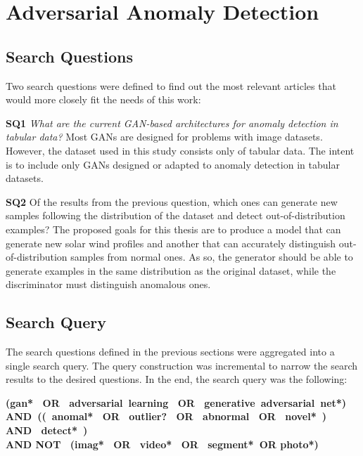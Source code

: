 \section{Adversarial Anomaly Detection}\label{sec:sota_anomaly_detection}

\subsection{Search Questions}\label{sec:gan_search_questions}
Two search questions were defined to find out the most relevant articles that would more closely fit the needs of this work:


\noindent\textbf{SQ1} \textit{What are the current GAN-based architectures for anomaly detection in tabular data?} Most GANs are designed for problems with image datasets. However, the dataset used in this study consists only of tabular data. The intent is to include only GANs designed or adapted to anomaly detection in tabular datasets.

\noindent\textbf{SQ2} Of the results from the previous question, which ones can generate new samples following the distribution of the dataset and detect out-of-distribution examples? The proposed goals for this thesis are to produce a model that can generate new solar wind profiles and another that can accurately distinguish out-of-distribution samples from normal ones. As so, the generator should be able to generate examples in the same distribution as the original dataset, while the discriminator must distinguish anomalous ones.

\subsection{Search Query}\label{sec:gan_search_queries}
The search questions defined in the previous sections were aggregated into a single search query. The query construction was incremental to narrow the search results to the desired questions. In the end, the search query was the following:
\begin{center}
\textbf{(gan*  OR  adversarial learning  OR  generative adversarial net*) \\ AND (( anomal*  OR  outlier?  OR  abnormal  OR  novel* )  AND  detect* ) \\ AND NOT  (imag*  OR  video*  OR  segment* OR photo*)}
\end{center}

